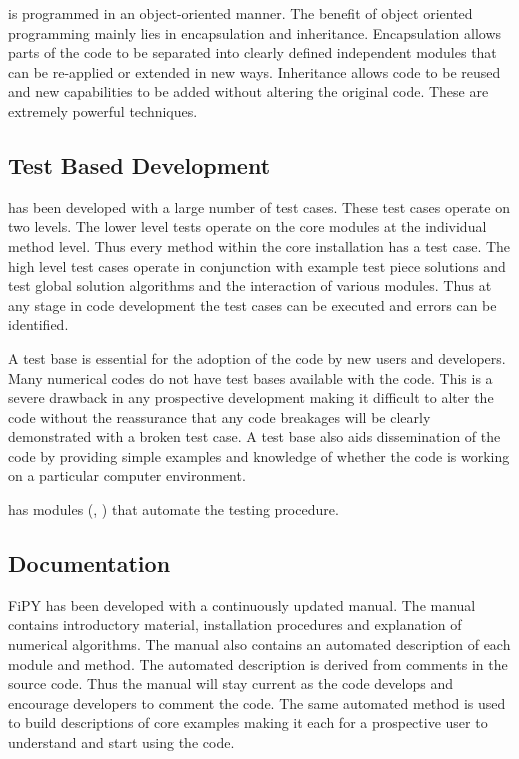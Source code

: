 \FiPy{} is programmed in an object-oriented manner. The benefit of object
oriented programming mainly lies in encapsulation and
inheritance. Encapsulation allows parts of the code to be separated
into clearly defined independent modules that can be re-applied or
extended in new ways. Inheritance allows code to be reused and new
capabilities to be added without altering the original code. These are
extremely powerful techniques.

\subsection{Test Based Development}

\FiPy{} has been developed with a large number of test cases. These test
cases operate on two levels. The lower level tests operate on the core
modules at the individual method level. Thus every method within the
core installation has a test case. The high level test cases operate
in conjunction with example test piece solutions and test global
solution algorithms and the interaction of various modules. Thus at
any stage in code development the test cases can be executed and
errors can be identified.

A test base is essential for the adoption of the code by new users and
developers. Many numerical codes do not have test bases available with
the code. This is a severe drawback in any prospective development
making it difficult to alter the code without the reassurance that any
code breakages will be clearly demonstrated with a broken test case. A
test base also aids dissemination of the code by providing simple
examples and knowledge of whether the code is working on a particular
computer environment.

\Python{} has modules (\doctest{}, \unittest{}) that automate the testing procedure.

\subsection{Documentation}

FiPY has been developed with a continuously updated manual. The manual
contains introductory material, installation procedures and
explanation of numerical algorithms. The manual also contains an
automated description of each module and method. The automated
description is derived from comments in the source code. Thus the
manual will stay current as the code develops and encourage developers
to comment the code. The same automated method is used to build
descriptions of core examples making it each for a prospective user to
understand and start using the code.

